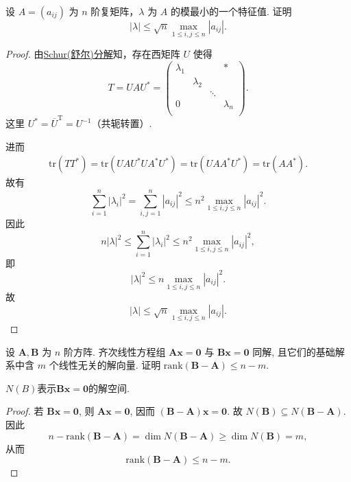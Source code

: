 \documentclass[../../main.tex]{subfiles}
\begin{document}
\begin{example}
设 \( A = (a_{ij}) \) 为 \( n \) 阶复矩阵，\( \lambda \) 为 \( A \) 的模最小的一个特征值. 证明
\[
|\lambda| \leqslant \sqrt{n} \max_{1 \leqslant i,j \leqslant n} |a_{ij}|.
\]
\end{example}
\begin{proof}
由\hyperref[theorem:Schur(舒尔)定理]{Schur(舒尔)分解}知，存在西矩阵 \( U \) 使得
\[
T = UAU^* = \left( \begin{matrix}
\lambda _1&		&		&		*\\
&		\lambda _2&		&		\\
&		&		\ddots&		\\
0&		&		&		\lambda _n\\
\end{matrix} \right) .
\]
这里 \( U^* = \overline{U}^\mathrm{T} =U^{-1}\)（共轭转置）.

进而
\begin{align*}
\mathrm{tr}(TT^*)= \mathrm{tr}(UAU^*UA^*U^*)= \mathrm{tr}(UAA^*U^*) = \mathrm{tr}(AA^*).
\end{align*}
故有
\[
\sum_{i=1}^n |\lambda_i|^2 = \sum_{i,j=1}^n |a_{ij}|^2 \leqslant n^2 \max_{1 \leqslant i,j \leqslant n} |a_{ij}|^2.
\]
因此
\[
n|\lambda|^2 \leqslant \sum_{i=1}^n |\lambda_i|^2 \leqslant n^2 \max_{1 \leqslant i,j \leqslant n} |a_{ij}|^2,
\]
即
\[
|\lambda|^2 \leqslant n \max_{1 \leqslant i,j \leqslant n} |a_{ij}|^2.
\]
故
\[
|\lambda| \leqslant \sqrt{n} \max_{1 \leqslant i,j \leqslant n} |a_{ij}|.
\]

\end{proof}

\begin{example}
设 $\boldsymbol{A},\boldsymbol{B}$ 为 $n$ 阶方阵. 齐次线性方程组 $\boldsymbol{A}\boldsymbol{x} = \boldsymbol{0}$ 与 $\boldsymbol{B}\boldsymbol{x} = \boldsymbol{0}$ 同解, 且它们的基础解系中含 $m$ 个线性无关的解向量. 证明 $\mathrm{rank}(\boldsymbol{B} - \boldsymbol{A}) \leqslant n - m$.
\end{example}
\begin{remark}
$N(B)$表示$\boldsymbol{B}\boldsymbol{x} = \boldsymbol{0}$的解空间.
\end{remark}
\begin{proof}
若 $\boldsymbol{B}\boldsymbol{x} = \boldsymbol{0}$, 则 $\boldsymbol{A}\boldsymbol{x} = \boldsymbol{0}$, 因而 $(\boldsymbol{B} - \boldsymbol{A})\boldsymbol{x} = \boldsymbol{0}$. 故 $N(\boldsymbol{B}) \subseteq N(\boldsymbol{B} - \boldsymbol{A})$. 因此
\[
n - \mathrm{rank}(\boldsymbol{B} - \boldsymbol{A}) = \dim N(\boldsymbol{B} - \boldsymbol{A}) \geqslant \dim N(\boldsymbol{B}) = m,
\]
从而
\[
\mathrm{rank}(\boldsymbol{B} - \boldsymbol{A}) \leqslant n - m.
\]

\end{proof}
\end{document}
